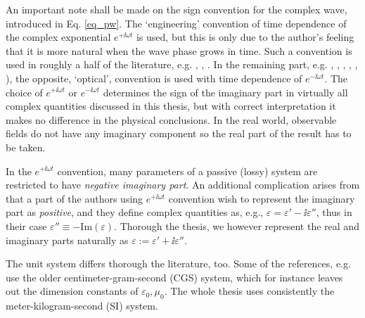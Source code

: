 An important note shall be made on the sign convention for the complex wave, introduced in Eq. \ref{eq_pw}.
The `engineering' convention of time dependence of the complex exponential $e^{+\ii \omega t}$ is used, but this is only due to the author's feeling that it is more natural when the wave phase grows in time. Such a convention is used in  roughly a half of the literature, e.g. \cite[p. 9]{engheta2006book}, \cite[pp. 21, 99]{krowne2007book}, \cite[Chapters 1-4, 6, 9 and 10]{eleftheriades2005book}.  In the remaining part, e.g. \cite[chapters 5, 7, 8]{eleftheriades2005book}, \cite{klingshirn2007semiconductor}, \cite{jackson1962book}, \cite{veselago1968}, \cite{born1999book}, \cite[p. 5]{noginov2011book}), the opposite, `optical', convention is used with time dependence of $e^{-\ii \omega t}$. The choice of $e^{+\ii\omega t}$ or $e^{-\ii\omega t}$ determines the sign of the imaginary part in virtually all complex quantities discussed in this thesis, but with correct interpretation it makes no difference in the physical conclusions.
In the real world, observable fields do not have any imaginary component so the real part of the result has to be taken. 

In the $e^{+\ii\omega t}$ convention, many parameters of a passive (lossy) system are restricted to have \textit{negative imaginary part}. An additional complication arises from that a part of the authors using $e^{+\ii\omega t}$ convention wish to represent the imaginary part as \textit{positive}, and they define complex quantities as, e.g., $\varepsilon = \varepsilon' - \ii \varepsilon''$, %
thus in their case $\varepsilon''\equiv -\text{Im}(\varepsilon)$. Thorough the thesis, we however represent the real and imaginary parts naturally as $\varepsilon := \varepsilon' + \ii \varepsilon''$.

The unit system differs thorough the literature, too. Some of the references, e.g. \cite{landau1984electrodynamics, agranovich2006spatial, krowne2007book_agran} use the older centimeter-gram-second (CGS) system, which for instance leaves out the dimension constants of $\varepsilon_0, \mu_0$. The whole thesis uses consistently the meter-kilogram-second (SI) system.

